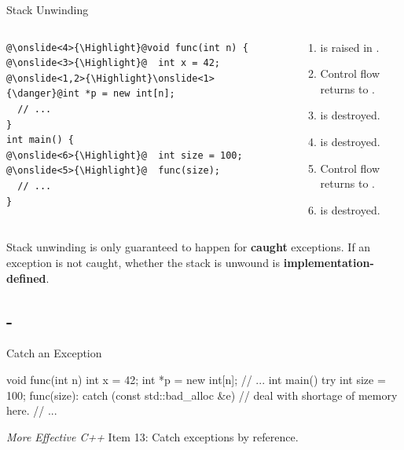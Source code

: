\documentclass{beamer}
\newcommand{\Highlight}{\makebox[0pt][l]{\color{pink}\rule[-4pt]{\textwidth}{11pt}}}
\begin{document}
\begin{frame}[fragile]{Stack Unwinding}
    \begin{columns}
        \begin{column}{0.4\linewidth}
            \begin{lstlisting}[language = {[11]C++}, escapechar = \@]
@\onslide<4>{\Highlight}@void func(int n) {
@\onslide<3>{\Highlight}@  int x = 42;
@\onslide<1,2>{\Highlight}\onslide<1>{\danger}@int *p = new int[n];
  // ...
}
int main() {
@\onslide<6>{\Highlight}@  int size = 100;
@\onslide<5>{\Highlight}@  func(size);
  // ...
}
            \end{lstlisting}
        \end{column}
        \begin{column}{0.6\linewidth}
            \begin{enumerate}
                \item {} is raised in \ttt{[]}.
                \item Control flow returns to .
                \item {} is destroyed.
                \item {} is destroyed.
                \item Control flow returns to .
                \item {} is destroyed.
            \end{enumerate}
        \end{column}
    \end{columns}
    \begin{notice}
        Stack unwinding is only guaranteed to happen for \textbf{caught} exceptions. If an exception is not caught, whether the stack is unwound is \textbf{implementation-defined}.
    \end{notice}
\end{frame}

\subsection{-}

\begin{frame}[fragile]{Catch an Exception}
    \begin{cpp}
void func(int n) {
  int x = 42;
  int *p = new int[n];
  // ...
}
int main() {
  try {
    int size = 100;
    func(size):
  } catch (const std::bad_alloc &e) {
    // deal with shortage of memory here.
  }
  // ...
}
    \end{cpp}
    \textit{More Effective C++} Item 13: Catch exceptions by reference.
\end{frame}
\end{document}
